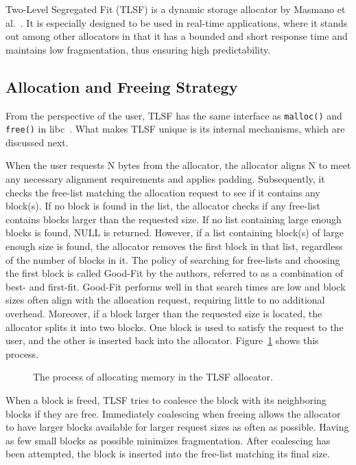 
Two-Level Segregated Fit (TLSF) is a dynamic storage allocator by Masmano et al.~\cite{TLSF}. It is especially designed to be used in real-time applications, where it stands out among other allocators in that it has a bounded and short response time and maintains low fragmentation, thus ensuring high predictability. 

\subsection{Allocation and Freeing Strategy}

From the perspective of the user, TLSF has the same interface as \texttt{malloc()} and \texttt{free()} in libc~\cite{mallocman}. What makes TLSF unique is its internal mechanisms, which are discussed next.

When the user requests N bytes from the allocator, the allocator aligns N to meet any necessary alignment requirements and applies padding. Subsequently, it checks the free-list matching the allocation request to see if it contains any block(s). If no block is found in the list, the allocator checks if any free-list contains blocks larger than the requested size. If no list containing large enough blocks is found, NULL is returned. However, if a list containing block(s) of large enough size is found, the allocator removes the first block in that list, regardless of the number of blocks in it. The policy of searching for free-lists and choosing the first block is called Good-Fit by the authors, referred to as a combination of best- and first-fit. Good-Fit performs well in that search times are low and block sizes often align with the allocation request, requiring little to no additional overhead. Moreover, if a block larger than the requested size is located, the allocator splits it into two blocks. One block is used to satisfy the request to the user, and the other is inserted back into the allocator. Figure~\ref{fig:tlsf_allocation} shows this process.

\begin{figure}[h]
    \centering
    
    \caption{The process of allocating memory in the TLSF allocator.}
    \label{fig:tlsf_allocation}
\end{figure}

When a block is freed, TLSF tries to coalesce the block with its neighboring blocks if they are free. Immediately coalescing when freeing allows the allocator to have larger blocks available for larger request sizes as often as possible. Having as few small blocks as possible minimizes fragmentation. After coalescing has been attempted, the block is inserted into the free-list matching its final size.

